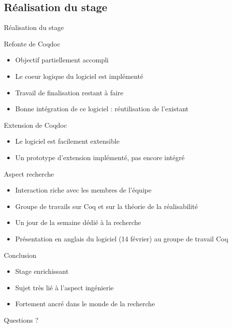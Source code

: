 \documentclass[compress]{beamer}
\newenvironment{tframe}[1]{
  \subsection{#1}
  \begin{frame}{#1}
  }{
  \end{frame}
  }
\begin{document}
\begin{tframe}{Réalisation du stage}
  \begin{block}{Refonte de Coqdoc}
    \begin{itemize}
  \item Objectif partiellement accompli
  \item Le coeur logique du logiciel est implémenté
  \item Travail de finalisation restant à faire
  \item Bonne intégration de ce logiciel : réutilisation de l'existant
\end{itemize}
  \end{block}
  \begin{block}{Extension de Coqdoc}
    \begin{itemize}
      \item Le logiciel est facilement extensible
      \item Un prototype d'extension implémenté, pas encore intégré
    \end{itemize}
  \end{block}
\end{tframe}

\begin{frame}{Aspect recherche}
    \begin{itemize}
      \item Interaction riche avec les membres de l'équipe
      \item Groupe de travails sur Coq et sur la théorie de la réalisabilité
      \item Un jour de la semaine dédié à la recherche
      \item Présentation en anglais du logiciel (14 février) au groupe de travail
        Coq
    \end{itemize}
\end{frame}

\begin{frame}{Conclusion}
  \begin{itemize}
    \item Stage enrichissant
    \item Sujet très lié à l'aspect ingénierie
    \item Fortement ancré dans le monde de la recherche
  \end{itemize}
    \vfill
  \begin{center} \large Questions ? \end{center}
\end{frame}
\end{document}
